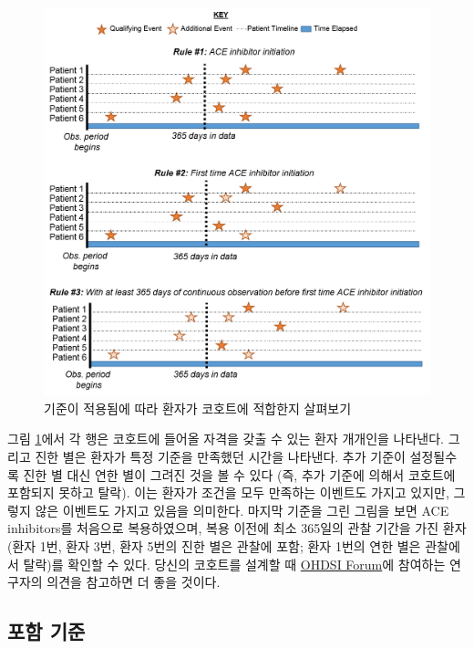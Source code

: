 \documentclass[10.5pt]{book}
\theoremstyle{definition}
\theoremstyle{definition}
\theoremstyle{definition}
\theoremstyle{remark}
\begin{document}
\begin{figure}

{\centering \includegraphics[width=1\linewidth]{images/Cohorts/EarliestEventExplained} 

}

\caption{기준이 적용됨에 따라 환자가 코호트에 적합한지 살펴보기}\label{fig:EarliestEventExplained}
\end{figure}

그림 \ref{fig:EarliestEventExplained}에서 각 행은 코호트에 들어올 자격을
갖출 수 있는 환자 개개인을 나타낸다. 그리고 진한 별은 환자가 특정 기준을
만족했던 시간을 나타낸다. 추가 기준이 설정될수록 진한 별 대신 연한 별이
그려진 것을 볼 수 있다 (즉, 추가 기준에 의해서 코호트에 포함되지 못하고
탈락). 이는 환자가 조건을 모두 만족하는 이벤트도 가지고 있지만, 그렇지
않은 이벤트도 가지고 있음을 의미한다. 마지막 기준을 그린 그림을 보면 ACE
inhibitors를 처음으로 복용하였으며, 복용 이전에 최소 365일의 관찰 기간을
가진 환자 (환자 1번, 환자 3번, 환자 5번의 진한 별은 관찰에 포함; 환자
1번의 연한 별은 관찰에서 탈락)를 확인할 수 있다. 당신의 코호트를 설계할
때 \href{http://forums.ohdsi.org}{OHDSI Forum}에 참여하는 연구자의
의견을 참고하면 더 좋을 것이다.

\subsection{포함 기준}\label{-}
\end{document}

